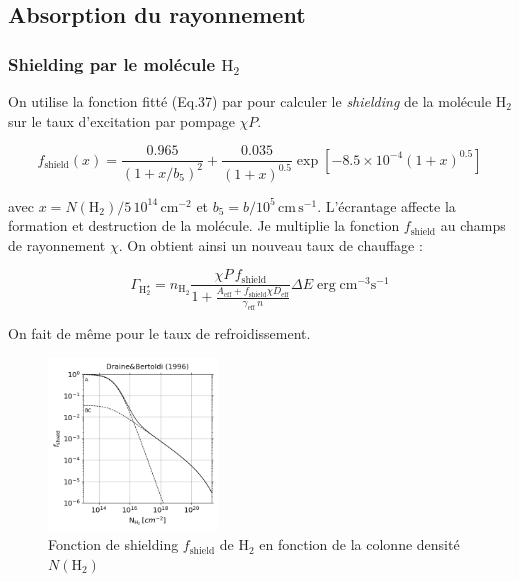 \subsection{Absorption du rayonnement}
\subsubsection{Shielding par le molécule $\mathrm{H}_2$}

On utilise la fonction fitté (Eq.37) par \cite{DraineBertoldi_1996} pour calculer le \textit{shielding} de la molécule $\mathrm{H}_2$ sur le taux d'excitation par pompage $\chi P$.

$$
f_{\text {shield}}\left(x\right)=\frac{0.965}{\left(1+x / b_{5}\right)^{2}}+\frac{0.035}{(1+x)^{0.5}} \exp \left[-8.5 \times 10^{-4}(1+x)^{0.5}\right]
$$

avec $x = N(\mathrm{H}_2)/5\,10^{14} \, \mathrm{cm}^{-2}$ et $b_5 = b/10^5 \, \mathrm{cm}\,\mathrm{s}^{-1}$. L'écrantage affecte la formation et destruction de la molécule. Je multiplie la fonction $f_{\text {shield}}$ au champs de rayonnement $\chi$.
On obtient ainsi un nouveau taux de chauffage :

\begin{equation}
    \Gamma_{\mathrm{H}_2^\star} = n_{\mathrm{H}_2}\frac{\chi P \, f_{\text {shield}}}{1 + \frac{A_{\text{eff}}+  f_{\text {shield}} \chi D_{\text{eff}}}{\gamma_{\text{eff}} \, n}} \Delta E \operatorname{erg} \mathrm{cm}^{-3} \mathrm{s}^{-1}
\end{equation}



On fait de même pour le taux de refroidissement.

\begin{figure}[h!]
    \centering
    \includegraphics[width = 0.4\textwidth]{figure/H2/pomp/fshield.png}
    \caption{Fonction de shielding $f_\mathrm{shield}$ de $\mathrm{H}_2$ en fonction de la colonne densité $N(\mathrm{H}_2)$}
    \label{fig:H2:fshield}
\end{figure}


